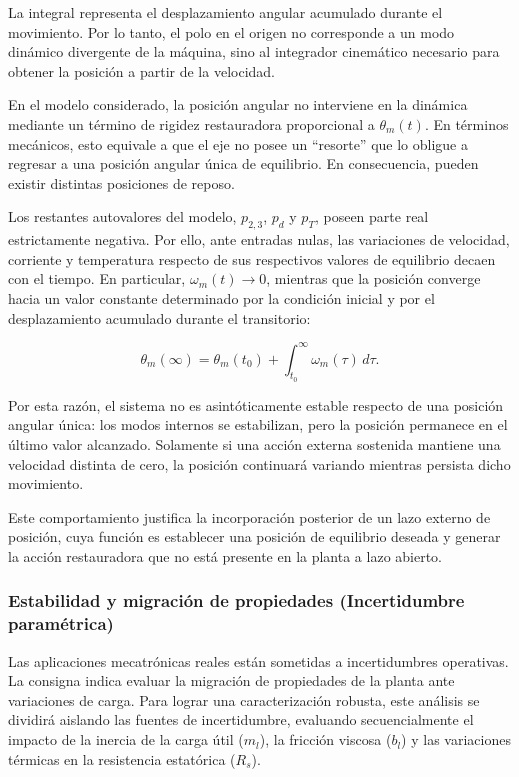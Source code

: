\documentclass[10pt,a4paper]{article}
\begin{document}
La integral representa el desplazamiento angular acumulado durante el
movimiento. Por lo tanto, el polo en el origen no corresponde a un modo
dinámico divergente de la máquina, sino al integrador cinemático necesario
para obtener la posición a partir de la velocidad.

En el modelo considerado, la posición angular no interviene en la dinámica
mediante un término de rigidez restauradora proporcional a
$\theta_m(t)$. En términos mecánicos, esto equivale a que el eje no posee un
``resorte'' que lo obligue a regresar a una posición angular única de
equilibrio. En consecuencia, pueden existir distintas posiciones de reposo.

Los restantes autovalores del modelo, $p_{2,3}$, $p_d$ y $p_T$, poseen parte
real estrictamente negativa. Por ello, ante entradas nulas, las variaciones
de velocidad, corriente y temperatura respecto de sus respectivos valores
de equilibrio decaen con el tiempo. En particular,
$\omega_m(t)\rightarrow 0$, mientras que la posición converge hacia un valor
constante determinado por la condición inicial y por el desplazamiento
acumulado durante el transitorio:

\begin{equation}
	\theta_m(\infty)
	=
	\theta_m(t_0)
	+
	\int_{t_0}^{\infty}\omega_m(\tau)\,d\tau.
\end{equation}

Por esta razón, el sistema no es asintóticamente estable respecto de una
posición angular única: los modos internos se estabilizan, pero la posición
permanece en el último valor alcanzado. Solamente si una acción externa
sostenida mantiene una velocidad distinta de cero, la posición continuará
variando mientras persista dicho movimiento.

Este comportamiento justifica la incorporación posterior de un lazo externo
de posición, cuya función es establecer una posición de equilibrio deseada y
generar la acción restauradora que no está presente en la planta a lazo
abierto.

\subsubsection{Estabilidad y migración de propiedades (Incertidumbre paramétrica)}

Las aplicaciones mecatrónicas reales están sometidas a incertidumbres operativas. 
La consigna indica evaluar la migración de propiedades de la planta ante variaciones de carga. 
Para lograr una caracterización robusta, 
este análisis se dividirá aislando las fuentes de incertidumbre, 
evaluando secuencialmente el impacto de la inercia de la carga útil ($m_l$), 
la fricción viscosa ($b_l$) y las variaciones térmicas en la resistencia estatórica ($R_s$).
\end{document}

